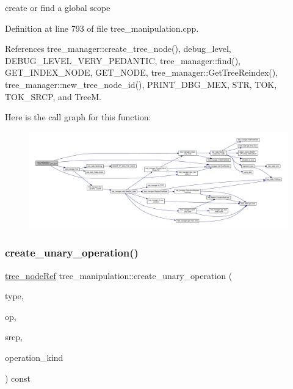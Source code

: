 create or find a global scope 



Definition at line 793 of file tree\+\_\+manipulation.\+cpp.



References tree\+\_\+manager\+::create\+\_\+tree\+\_\+node(), debug\+\_\+level, D\+E\+B\+U\+G\+\_\+\+L\+E\+V\+E\+L\+\_\+\+V\+E\+R\+Y\+\_\+\+P\+E\+D\+A\+N\+T\+IC, tree\+\_\+manager\+::find(), G\+E\+T\+\_\+\+I\+N\+D\+E\+X\+\_\+\+N\+O\+DE, G\+E\+T\+\_\+\+N\+O\+DE, tree\+\_\+manager\+::\+Get\+Tree\+Reindex(), tree\+\_\+manager\+::new\+\_\+tree\+\_\+node\+\_\+id(), P\+R\+I\+N\+T\+\_\+\+D\+B\+G\+\_\+\+M\+EX, S\+TR, T\+OK, T\+O\+K\+\_\+\+S\+R\+CP, and TreeM.

Here is the call graph for this function\+:
\nopagebreak
\begin{figure}[H]
\begin{center}
\leavevmode
\includegraphics[width=350pt]{d0/d99/classtree__manipulation_ae4e9b96f56a35d0d75db91cc8acd16ad_cgraph}
\end{center}
\end{figure}
\mbox{\label{classtree__manipulation_ad87bbd38f417db13f3699aeccf6011a4}} 
\subsubsection{\texorpdfstring{create\+\_\+unary\+\_\+operation()}{create\_unary\_operation()}}
{\footnotesize\ttfamily \hyperlink{tree__node_8hpp_a6ee377554d1c4871ad66a337eaa67fd5}{tree\+\_\+node\+Ref} tree\+\_\+manipulation\+::create\+\_\+unary\+\_\+operation (\begin{DoxyParamCaption}\item[{const \hyperlink{tree__node_8hpp_a6ee377554d1c4871ad66a337eaa67fd5}{tree\+\_\+node\+Ref} \&}]{type,  }\item[{const \hyperlink{tree__node_8hpp_a6ee377554d1c4871ad66a337eaa67fd5}{tree\+\_\+node\+Ref} \&}]{op,  }\item[{const std\+::string \&}]{srcp,  }\item[{enum \hyperlink{tree__common_8hpp_a9efbd7c7191fb190b76c2fd05d6e7b45}{kind}}]{operation\+\_\+kind }\end{DoxyParamCaption}) const}



